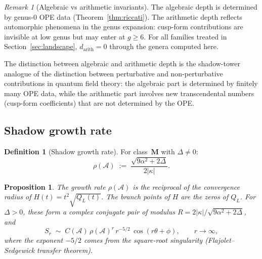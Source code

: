\documentclass[11pt,reqno]{amsart}
\newtheorem{proposition}[theorem]{Proposition}
\theoremstyle{definition}
\newtheorem{definition}[theorem]{Definition}
\theoremstyle{remark}
\newtheorem{remark}[theorem]{Remark}
\newcommand{\cA}{\mathcal{A}}
\numberwithin{equation}{section}
\begin{document}
\begin{remark}[Algebraic vs arithmetic
invariants]\label{rem:alg-arith}
The algebraic depth is determined by genus-$0$ OPE data
(Theorem~\ref{thm:riccati}). The arithmetic depth reflects
automorphic phenomena in the genus expansion: cusp-form
contributions are invisible at low genus but may enter at
$g \ge 6$. For all families treated in
Section~\ref{sec:landscape}, $d_{\mathrm{arith}} = 0$
through the genera computed here.

The distinction between algebraic and arithmetic depth is
the shadow-tower analogue of the distinction between
perturbative and non-perturbative contributions in quantum
field theory: the algebraic part is determined by finitely
many OPE data, while the arithmetic part involves new
transcendental numbers (cusp-form coefficients) that are
not determined by the OPE.
\end{remark}


\subsection{Shadow growth rate}\label{subsec:growth-rate}

\begin{definition}[Shadow growth
rate]\label{def:shadow-radius}
For class~$\mathbf{M}$ with $\Delta \ne 0$:
\[
 \rho(\cA)
 \;:=\;
 \frac{\sqrt{9\alpha^2 + 2\Delta}}{2|\kappa|}.
\]
\end{definition}

\begin{proposition}\label{prop:rho-convergence}
The growth rate $\rho(\cA)$ is the reciprocal of the
convergence radius of $H(t) = t^2\sqrt{Q_L(t)}$. The
branch points of $H$ are the zeros of $Q_L$. For
$\Delta > 0$, these form a complex conjugate pair of
modulus $R = 2|\kappa|/\sqrt{9\alpha^2 + 2\Delta}$, and
\[
 S_r
 \;\sim\;
 C(\cA)\,\rho(\cA)^r\, r^{-5/2}\,
 \cos(r\theta + \phi),
 \qquad r \to \infty,
\]
where the exponent $-5/2$ comes from the square-root
singularity (Flajolet--Sedgewick transfer theorem).
\end{proposition}
\end{document}
